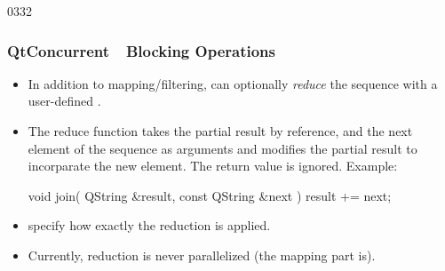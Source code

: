 \begin{slide}[fragile]{0332}
\frametitle{QtConcurrent~\textemdash~Blocking Operations}
  \begin{itemize}
  \item In addition to mapping/filtering,  can optionally
    \emph{reduce} the sequence with a user-defined \emph{}.
  \item The reduce function takes the partial result by reference,
    and the next element of the sequence as arguments and modifies the
    partial result to incorparate the new element. The return value is
    ignored. Example:%
\begin{cpp}
  void join( QString &result, const QString &next ) {
    result += next;
  }
\end{cpp}
\item {} specify how exactly the
  reduction is applied.
\item Currently, reduction is never parallelized (the mapping part is).
  \end{itemize}
\end{slide}
